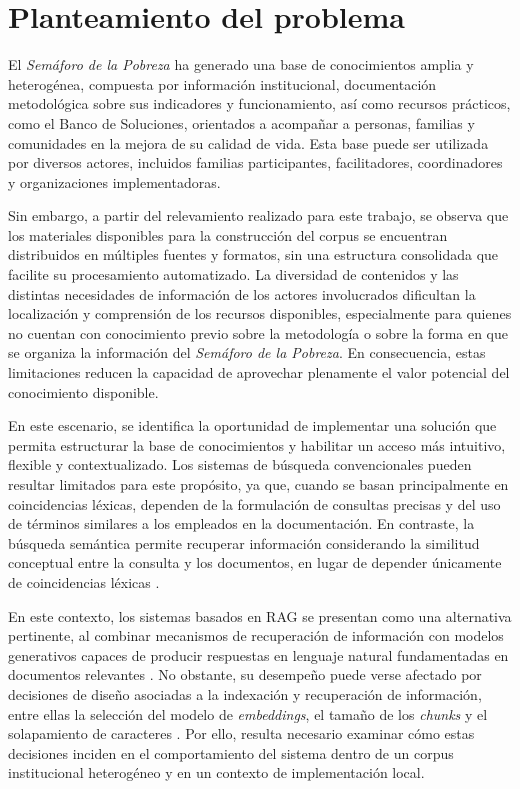 \documentclass{article}
\begin{document}
\section{Planteamiento del problema}\label{sec:planteamiento}

El \textit{Semáforo de la Pobreza} ha generado una base de conocimientos amplia y heterogénea, compuesta por información institucional, documentación metodológica sobre sus indicadores y funcionamiento, así como recursos prácticos, como el Banco de Soluciones, orientados a acompañar a personas, familias y comunidades en la mejora de su calidad de vida. Esta base puede ser utilizada por diversos actores, incluidos familias participantes, facilitadores, coordinadores y organizaciones implementadoras.

Sin embargo, a partir del relevamiento realizado para este trabajo, se observa que los materiales disponibles para la construcción del corpus se encuentran distribuidos en múltiples fuentes y formatos, sin una estructura consolidada que facilite su procesamiento automatizado. La diversidad de contenidos y las distintas necesidades de información de los actores involucrados dificultan la localización y comprensión de los recursos disponibles, especialmente para quienes no cuentan con conocimiento previo sobre la metodología o sobre la forma en que se organiza la información del \textit{Semáforo de la Pobreza}. En consecuencia, estas limitaciones reducen la capacidad de aprovechar plenamente el valor potencial del conocimiento disponible.

En este escenario, se identifica la oportunidad de implementar una solución que permita estructurar la base de conocimientos y habilitar un acceso más intuitivo, flexible y contextualizado. Los sistemas de búsqueda convencionales pueden resultar limitados para este propósito, ya que, cuando se basan principalmente en coincidencias léxicas, dependen de la formulación de consultas precisas y del uso de términos similares a los empleados en la documentación. En contraste, la búsqueda semántica permite recuperar información considerando la similitud conceptual entre la consulta y los documentos, en lugar de depender únicamente de coincidencias léxicas \cite{farivar2025semantic_search}.

En este contexto, los sistemas basados en RAG se presentan como una alternativa pertinente, al combinar mecanismos de recuperación de información con modelos generativos capaces de producir respuestas en lenguaje natural fundamentadas en documentos relevantes \cite{Lewis2020RAG}. No obstante, su desempeño puede verse afectado por decisiones de diseño asociadas a la indexación y recuperación de información, entre ellas la selección del modelo de \textit{embeddings}, el tamaño de los \textit{chunks} y el solapamiento de caracteres \cite{gao2023retrieval, barnett2024seven}. Por ello, resulta necesario examinar cómo estas decisiones inciden en el comportamiento del sistema dentro de un corpus institucional heterogéneo y en un contexto de implementación local.
\end{document}
